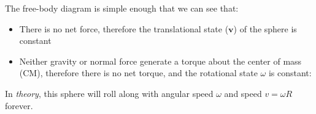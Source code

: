%
%
%  




The free-body diagram is simple enough that we can see that:
\begin{itemize}
\item There is no net force, therefore the translational state ($\bm v$) of
  the sphere is constant
%
\item Neither gravity or normal force generate a torque about the center of
  mass (CM), therefore there is no net torque, and the rotational state
  $\omega$ is constant:
%  
\end{itemize}
In \emph{theory}, this sphere will roll along with angular speed $\omega$
and speed $v=\omega R$ forever.


